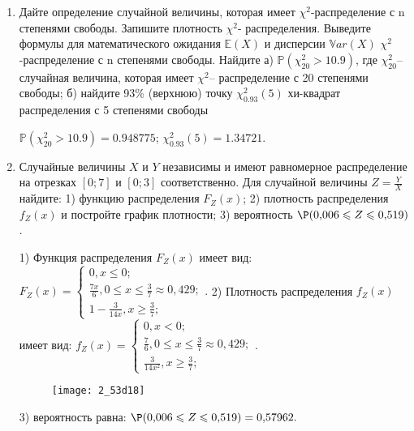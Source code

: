 \documentclass[a4paper,12pt]{article}
\begin{document}
\begin{enumerate}


\item


Дайте определение случайной величины, которая имеет $\chi ^{2}$-распределение с n степенями свободы.
Запишите плотность $\chi ^{2}$- распределения. Выведите формулы для математического ожидания $\mathbb{E}(X)$ и дисперсии $\mathbb{V}ar(X)$ $\chi ^{2}$-распределение с n степенями свободы. Найдите а) $\mathbb{P}(\chi _{20}^{2} > 10.9)$, где $\chi _{20}^{2}$–случайная величина, которая имеет $\chi ^{2}$– распределение с 20 степенями свободы; б) найдите 93\%
(верхнюю) точку $\chi _{0.93}^{2} (5)$ хи-квадрат распределения с 5 степенями свободы




$\mathbb{P}(\chi _{20}^{2} > 10.9) =  0.948775$; $\chi _{0.93}^{2} (5) = 1.34721$.


\item



Случайные величины $X$ и $Y$ независимы и имеют равномерное
распределение на отрезках $[0;7]$ и $[0;3]$ соответственно. Для случайной величины $Z=\frac{Y}{X}$ найдите: 
1) функцию распределения $F_Z(x)$;
2) плотность распределения $f_Z(x)$ и постройте график плотности;
3) вероятность $\P(0,\!006\leqslant Z\leqslant 0,\!519)$.




1) Функция распределения $F_Z(x)$ имеет вид:
$
F_Z(x)=\left\{
\begin{array}{l}
0, x\leqslant 0;\\
\frac{7 x}{6}, 0\leqslant x\leqslant \frac{3}{7}\approx 0,\!429;\\
1 - \frac{3}{14 x}, x\geqslant\frac{3}{7};
\end{array}.
\right.
$
2) Плотность распределения $f_Z(x)$ имеет вид:
$
f_Z(x)=\left\{
\begin{array}{l}
0, x<0;\\
\frac{7}{6}, 0\leqslant x\leqslant \frac{3}{7}\approx 0,\!429;\\
\frac{3}{14 x^{2}}, x\geqslant\frac{3}{7};
\end{array}.
\right.
$


\begin{figure}[H]
    \texttt{[image: 2\_53d18]}
\end{figure}


3) вероятность равна:
$
\P(0,\!006\leqslant Z\leqslant 0,\!519)=
0,\!57962.
$



\end{enumerate}
\end{document}
